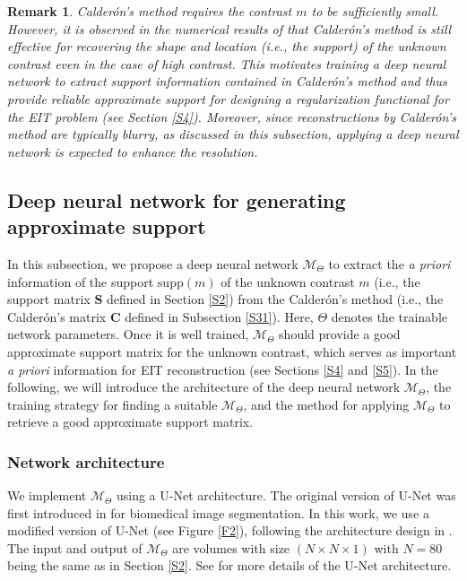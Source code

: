 \documentclass[11pt]{article}
\newcommand{\Calderon}{Calder\'{o}n}
\newcommand{\bds}[1]{\boldsymbol{#1}}
\newtheorem{remark}{Remark}[section]
\begin{document}
\begin{remark}\label{R1}\rm
\Calderon's method requires the contrast $m$ to be sufficiently small.
However, it is observed in the numerical results of \cite[Chapter 2.3]{BJ09} that \Calderon's method is still effective for recovering the shape and location (i.e., the support) of the unknown contrast even in the case of high contrast.
This motivates training a deep neural network to extract support information contained in \Calderon's method and thus provide reliable approximate support for designing a regularization functional for the EIT problem (see Section \ref{S4}).
Moreover, since reconstructions by \Calderon's method are typically blurry, as discussed in this subsection, applying a deep neural network is expected to enhance the resolution.
\end{remark}

\subsection{Deep neural network for generating approximate support}\label{S32}

In this subsection, we propose a deep neural network $\mathcal{M}_\Theta$ to extract the \textit{a priori} information of the support $ \mathrm{supp}(m) $ of the unknown contrast $ m $ (i.e., the support matrix $ \bds{S} $ defined in Section \ref{S2}) from the \Calderon's method (i.e., the \Calderon's matrix $ \bds{C} $ defined in Subsection \ref{S31}). 
Here, $\Theta$ denotes the trainable network parameters.
Once it is well trained, $\mathcal{M}_\Theta$ should provide a good approximate support matrix for the unknown contrast, which serves as important \textit{a priori} information for EIT reconstruction (see Sections \ref{S4} and \ref{S5}). 
In the following, we will introduce the architecture of the deep neural network $\mathcal{M}_\Theta$, the training strategy for finding a suitable $\mathcal{M}_\Theta$, and the method for applying $\mathcal{M}_\Theta$ to retrieve a good approximate support matrix.


\subsubsection{Network architecture}

We implement $\mathcal{M}_\Theta$ using a U-Net architecture. 
The original version of U-Net was first introduced in \cite{ROF15} for biomedical image segmentation. 
In this work, we use a modified version of U-Net (see Figure \ref{F2}), following the architecture design in \cite{LZZ24}.
The input and output of $\mathcal{M}_\Theta$ are volumes with size $ (N\times N \times 1) $ with $ N = 80 $ being the same as in Section \ref{S2}. 
See \cite{LZZ24, ROF15} for more details of the U-Net architecture.
\end{document}
